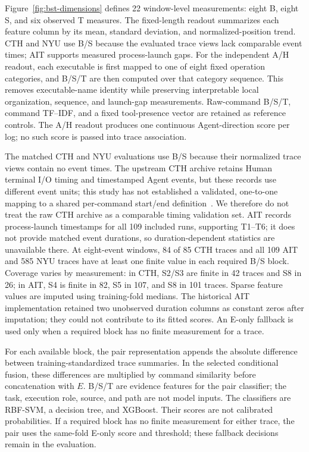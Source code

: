 \documentclass[10pt]{article}
\begin{document}
Figure~\ref{fig:bst-dimensions} defines 22 window-level measurements: eight B, eight S, and six observed T measures. The fixed-length readout summarizes each feature column by its mean, standard deviation, and normalized-position trend. CTH and NYU use B/S because the evaluated trace views lack comparable event times; AIT supports measured process-launch gaps. For the independent A/H readout, each executable is first mapped to one of eight fixed operation categories, and B/S/T are then computed over that category sequence. This removes executable-name identity while preserving interpretable local organization, sequence, and launch-gap measurements. Raw-command B/S/T, command TF--IDF, and a fixed tool-presence vector are retained as reference controls. The A/H readout produces one continuous Agent-direction score per log; no such score is passed into trace association.

The matched CTH and NYU evaluations use B/S because their normalized trace views contain no event times. The upstream CTH archive retains Human terminal I/O timing and timestamped Agent events, but these records use different event units; this study has not established a validated, one-to-one mapping to a shared per-command start/end definition~\cite{cth,inspect}. We therefore do not treat the raw CTH archive as a comparable timing validation set. AIT records process-launch timestamps for all 109 included runs, supporting T1--T6; it does not provide matched event durations, so duration-dependent statistics are unavailable there. At eight-event windows, 84 of 85 CTH traces and all 109 AIT and 585 NYU traces have at least one finite value in each required B/S block. Coverage varies by measurement: in CTH, S2/S3 are finite in 42 traces and S8 in 26; in AIT, S4 is finite in 82, S5 in 107, and S8 in 101 traces. Sparse feature values are imputed using training-fold medians. The historical AIT implementation retained two unobserved duration columns as constant zeros after imputation; they could not contribute to its fitted scores. An E-only fallback is used only when a required block has no finite measurement for a trace.

For each available block, the pair representation appends the absolute difference between training-standardized trace summaries. In the selected conditional fusion, these differences are multiplied by command similarity before concatenation with $E$. B/S/T are evidence features for the pair classifier; the task, execution role, source, and path are not model inputs. The classifiers are RBF-SVM, a decision tree, and XGBoost. Their scores are not calibrated probabilities. If a required block has no finite measurement for either trace, the pair uses the same-fold E-only score and threshold; these fallback decisions remain in the evaluation.
\end{document}
